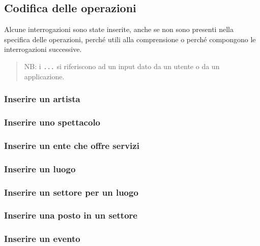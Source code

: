 \documentclass[a4paper,11pt]{article}
\begin{document}
\subsection{Codifica delle operazioni}
Alcune interrogazioni sono state inserite, anche se non sono presenti 
nella specifica delle operazioni, perché utili alla comprensione o perché
compongono le interrogazioni successive.

\begin{quote}
  NB: i \texttt{...} si riferiscono ad un input dato da un utente o da
  un applicazione.
\end{quote}

\subsubsection{Inserire un artista}


\subsubsection{Inserire uno spettacolo}


\subsubsection{Inserire un ente che offre servizi}


\subsubsection{Inserire un luogo}


\subsubsection{Inserire un settore per un luogo}


\subsubsection{Inserire una posto in un settore}


\subsubsection{Inserire un evento}

\end{document}
